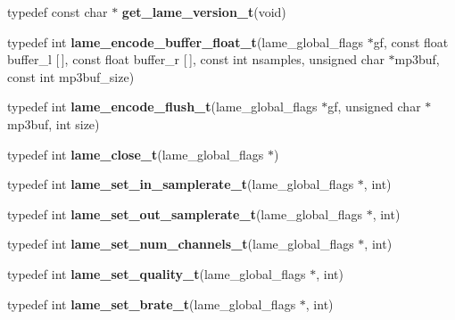 \begin{DoxyCompactItemize}
typedef const char $\ast$ {\bfseries get\+\_\+lame\+\_\+version\+\_\+t}(void)
\item 
\mbox{\label{namespace_ms_af905712e50cd899d7b7a9fd1896766e5}} 
typedef int {\bfseries lame\+\_\+encode\+\_\+buffer\+\_\+float\+\_\+t}(lame\+\_\+global\+\_\+flags $\ast$gf, const float buffer\+\_\+l \mbox{[}$\,$\mbox{]}, const float buffer\+\_\+r \mbox{[}$\,$\mbox{]}, const int nsamples, unsigned char $\ast$mp3buf, const int mp3buf\+\_\+size)
\item 
\mbox{\label{namespace_ms_a8d3e48d5640c14e96d2db9a4bdb8886f}} 
typedef int {\bfseries lame\+\_\+encode\+\_\+flush\+\_\+t}(lame\+\_\+global\+\_\+flags $\ast$gf, unsigned char $\ast$mp3buf, int size)
\item 
\mbox{\label{namespace_ms_ada3a19e1b21923e96fb7197fa9255973}} 
typedef int {\bfseries lame\+\_\+close\+\_\+t}(lame\+\_\+global\+\_\+flags $\ast$)
\item 
\mbox{\label{namespace_ms_a963a1f4102e9958e28d7bef228777476}} 
typedef int {\bfseries lame\+\_\+set\+\_\+in\+\_\+samplerate\+\_\+t}(lame\+\_\+global\+\_\+flags $\ast$, int)
\item 
\mbox{\label{namespace_ms_a183598b22ee5e756eb784e40ebe24658}} 
typedef int {\bfseries lame\+\_\+set\+\_\+out\+\_\+samplerate\+\_\+t}(lame\+\_\+global\+\_\+flags $\ast$, int)
\item 
\mbox{\label{namespace_ms_a9398641ed84cb91f5361d54f501bb572}} 
typedef int {\bfseries lame\+\_\+set\+\_\+num\+\_\+channels\+\_\+t}(lame\+\_\+global\+\_\+flags $\ast$, int)
\item 
\mbox{\label{namespace_ms_a0a27d432441d9ecf27847da72c9d02e1}} 
typedef int {\bfseries lame\+\_\+set\+\_\+quality\+\_\+t}(lame\+\_\+global\+\_\+flags $\ast$, int)
\item 
\mbox{\label{namespace_ms_abab90919791bf28a51d23dde9fa6bcec}} 
typedef int {\bfseries lame\+\_\+set\+\_\+brate\+\_\+t}(lame\+\_\+global\+\_\+flags $\ast$, int)
\item 
\mbox{\label{namespace_ms_abeb0f42777afd07c549366194c6747bc}} 

\end{DoxyCompactItemize}
